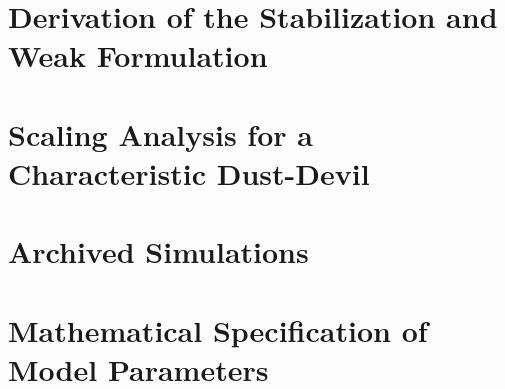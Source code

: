 \documentclass[draft,tgtermes,12pt]{report}    %
\theoremstyle{definition}
\theoremstyle{remark}
\begin{document}
%

\appendices

\chapter{Derivation of the Stabilization and Weak Formulation}


\chapter{Scaling Analysis for a Characteristic Dust-Devil}


\chapter{Archived Simulations}


\chapter{Mathematical Specification of Model Parameters}

\end{document}
